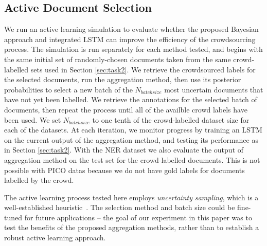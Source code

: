 \subsection{Active Document Selection}

We run an active learning simulation to evaluate whether the proposed Bayesian approach and integrated LSTM
can improve the efficiency of the crowdsourcing process. 
The simulation is run separately for each method tested, and begins with the same initial set of randomly-chosen
documents taken from the same crowd-labelled sets used in Section \ref{sec:task2}.
We retrieve the crowdsourced labels for the selected documents, run the aggregation method,
then use its posterior probabilities to select a new batch of the $N_{batchsize}$ most uncertain documents that have not yet been labelled. 
We retrieve the annotations for the selected batch of documents, then repeat the process until
all of the availble crowd labels have been used.
We set $N_{batchsize}$ to one tenth of the crowd-labelled dataset size for each of the datasets. At each iteration,
we monitor progress by training an LSTM on the current output of the aggregation method, 
and testing its performance as in Section \ref{sec:task2}. 
With the NER dataset we also evaluate the output of aggregation method on the test set for the crowd-labelled documents. 
This is not possible with PICO datas because we do not have gold labels for documents labelled by the crowd.

The active learning process tested here employs \emph{uncertainty sampling}, which is a 
well-established heuristic~\cite{settles2010active}. 
The selection method and batch size could be fine-tuned for future applications -- the 
goal of our experiment in this paper was to test the benefits of the proposed aggregation methods,
rather than to establish a robust active learning approach.
 
